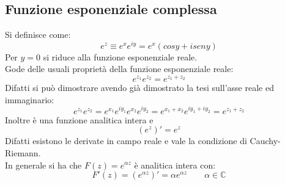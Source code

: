 \documentclass[twoside]{article}
\begin{document}
	\begin{comment}
	
	\subsubsection{Esempi dell'uso delle coordinate polari}
	\begin{itemize}
		\item $f(z)=\frac{1}{z}$ è un rapporto di funzioni analitiche, per cui è analitica $\forall z \ne$0. Si verificano facilmente le condizioni di Cauchy-Riemann e la sua derivata prima...
		\item $f(z)=z^n$...\\
		Mega contoni per dimostrare cose banali con le coordinate polari, per ora salto.\\
	\end{itemize}
	
	\end{comment}
	
	\subsection{Funzione esponenziale complessa}
	Si definisce come:
	\begin{equation}
		e^z\equiv e^xe^{iy}=e^x(cosy+iseny)
	\end{equation}
	Per $y=0$ si riduce alla funzione esponenziale reale.\\
	Gode delle usuali proprietà della funzione esponenziale reale:
	\begin{equation}
	e^{z_1}e^{z_2}=e^{z_1+z_2}
	\end{equation}
	Difatti si può dimostrare avendo già dimostrato la tesi sull'asse reale ed immaginario:
	\begin{equation}
		e^{z_1}e^{z_2}=e^{x_1}e^{iy_1}e^{x_2}e^{iy_2}=e^{x_1+x_2}e^{iy_1+iy_2}=e^{z_1+z_2}
	\end{equation}
	Inoltre è una funzione analitica intera e
	\begin{equation*}
		(e^z)'=e^z
	\end{equation*}
	Difatti esistono le derivate in campo reale e vale la condizione di Cauchy-Riemann.\\
	In generale si ha che $F(z)=e^{\alpha z}$ è analitica intera con:
	\begin{equation}\label{2.4.4}
		F'(z)=(e^{\alpha z})'=\alpha e^{\alpha z} \qquad \alpha \in \mathds{C}
	\end{equation}
\end{document}
